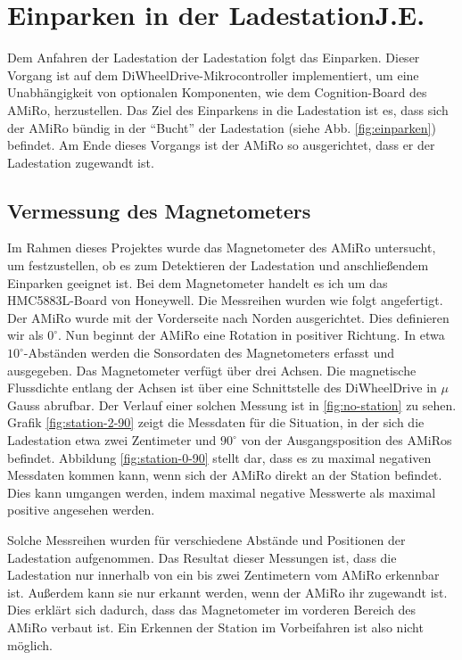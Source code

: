 \section[Einparken in der Ladestation]{Einparken in der Ladestation\hfill {\normalsize J.E.}}\label{kap:einparken_ladestation} %
Dem Anfahren der Ladestation der Ladestation folgt das Einparken. Dieser Vorgang ist auf dem DiWheelDrive-Mikrocontroller implementiert, um eine Unabhängigkeit von optionalen Komponenten, wie dem Cognition-Board des AMiRo, herzustellen. Das Ziel des Einparkens in die Ladestation ist es, dass sich der AMiRo bündig in der ``Bucht'' der Ladestation (siehe Abb. \ref{fig:einparken}) befindet. Am Ende dieses Vorgangs ist der AMiRo so ausgerichtet, dass er der Ladestation zugewandt ist.

\subsection{Vermessung des Magnetometers}
Im Rahmen dieses Projektes wurde das Magnetometer des AMiRo untersucht, um festzustellen, ob es zum Detektieren der Ladestation und anschließendem Einparken geeignet ist.
Bei dem Magnetometer handelt es ich um das HMC5883L-Board von Honeywell.
Die Messreihen wurden wie folgt angefertigt. Der AMiRo wurde mit der Vorderseite nach Norden ausgerichtet. Dies definieren wir als $0^\circ$. Nun beginnt der AMiRo eine Rotation in positiver Richtung. In etwa $10^\circ$-Abständen werden die Sonsordaten des Magnetometers erfasst und ausgegeben. Das Magnetometer verfügt über drei Achsen. Die magnetische Flussdichte entlang der Achsen ist über eine Schnittstelle des DiWheelDrive in $\mu$Gauss abrufbar. Der Verlauf einer solchen Messung ist in \ref{fig:no-station} zu sehen.
Grafik \ref{fig:station-2-90} zeigt die Messdaten für die Situation, in der sich die Ladestation etwa zwei Zentimeter und $90^\circ$ von der Ausgangsposition des AMiRos befindet.
Abbildung \ref{fig:station-0-90} stellt dar, dass es zu maximal negativen Messdaten kommen kann, wenn sich der AMiRo direkt an der Station befindet. Dies kann umgangen werden, indem maximal negative Messwerte als maximal positive angesehen werden.

Solche Messreihen wurden für verschiedene Abstände und Positionen der Ladestation aufgenommen. Das Resultat dieser Messungen ist, dass die Ladestation nur innerhalb von ein bis zwei Zentimetern vom AMiRo erkennbar ist. Außerdem kann sie nur erkannt werden, wenn der AMiRo ihr zugewandt ist. Dies erklärt sich dadurch, dass das Magnetometer im vorderen Bereich des AMiRo verbaut ist. Ein Erkennen der Station im Vorbeifahren ist also nicht möglich.

